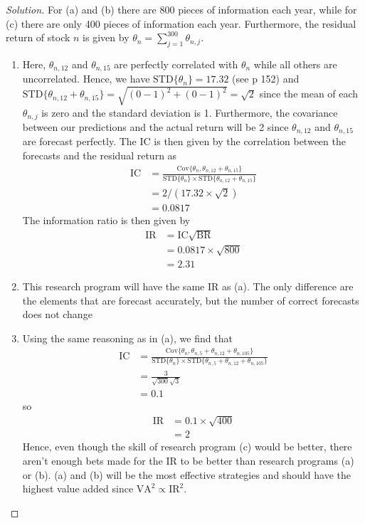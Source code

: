 \begin{proof}[Solution]
 For (a) and (b) there are 800 pieces of information each year, while for (c) there are only 400 pieces of information each year. Furthermore, the residual return of stock $n$ is given by $\theta_{n}=\sum_{j=1}^{300}\theta_{n,j}$.
 \begin{enumerate}[label=(\alph*)]
  \item{Here, $\theta_{n,12}$ and $\theta_{n,15}$ are perfectly correlated with $\theta_{n}$ while all others are uncorrelated. Hence, we have $\mathrm{STD}\{\theta_{n}\}=17.32$ (see p 152) and $\mathrm{STD}\{\theta_{n,12}+\theta_{n,15}\}=\sqrt{(0-1)^{2}+(0-1)^{2}}=\sqrt{2}$ since the mean of each $\theta_{n,j}$ is zero and the standard deviation is 1. Furthermore, the covariance between our predictions and the actual return will be 2 since $\theta_{n,12}$ and $\theta_{n,15}$ are forecast perfectly. The $\mathrm{IC}$ is then given by the correlation between the forecasts and the residual return as
  \begin{align*}
   \mathrm{IC}&=\frac{\mathrm{Cov}\{\theta_{n},\theta_{n,12}+\theta_{n,15}\}}{\mathrm{STD}\{\theta_{n}\}\times\mathrm{STD}\{\theta_{n,12}+\theta_{n,15}\}}\\
	      &=2/(17.32\times\sqrt{2})\\
	      &=0.0817
  \end{align*}
  The information ratio is then given by
  \begin{align*}
   \mathrm{IR}&=\mathrm{IC}\sqrt{\mathrm{BR}}\\
	      &=0.0817\times\sqrt{800}\\
	      &=2.31
  \end{align*}
  }
  \item{This research program will have the same IR as (a). The only difference are the elements that are forecast accurately, but the number of correct forecasts does not change}
  \item{Using the same reasoning as in (a), we find that
  \begin{align*}
   \mathrm{IC}&=\frac{\mathrm{Cov}\{\theta_{n},\theta_{n,5}+\theta_{n,12}+\theta_{n,105}\}}{\mathrm{STD}\{\theta_{n}\}\times\mathrm{STD}\{\theta_{n,5}+\theta_{n,12}+\theta_{n,105}\}}\\
	      &=\frac{3}{\sqrt{300}\sqrt{3}}\\
	      &=0.1
  \end{align*}
  so
  \begin{align*}
   \mathrm{IR}&=0.1\times\sqrt{400}\\
	      &=2
  \end{align*}
  Hence, even though the skill of research program (c) would be better, there aren't enough bets made for the IR to be better than research programs (a) or (b). (a) and (b) will be the most effective strategies and should have the highest value added since $\mathrm{VA}^{2}\propto\mathrm{IR}^{2}$.
}
 \end{enumerate}

\end{proof}


